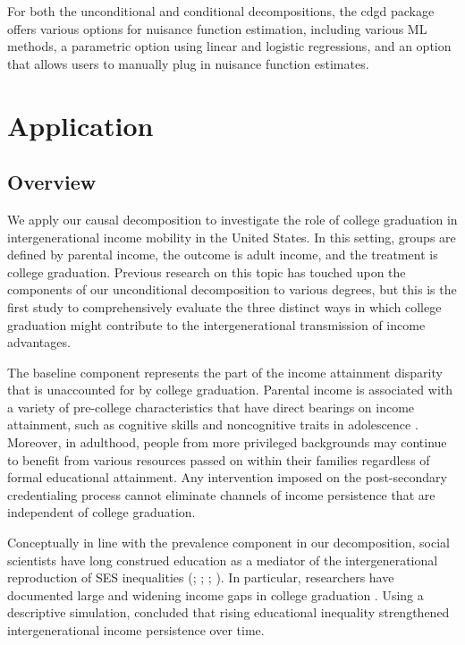 \documentclass[12pt,a4paper]{article}
\begin{document}
For both the unconditional and conditional decompositions, the cdgd package offers various options for nuisance function estimation, including various ML methods, a parametric option using linear and logistic regressions, and an option that allows users to manually plug in nuisance function estimates.


\section{Application}
\subsection{Overview}
We apply our causal decomposition to investigate the role of college graduation in intergenerational income mobility in the United States. In this setting, groups are defined by parental income, the outcome is adult income, and the treatment is college graduation. 
Previous research on this topic has touched upon the components of our unconditional decomposition to various degrees, but this is the first study to comprehensively evaluate the three distinct ways in which college graduation might contribute to the intergenerational transmission of income advantages. 

The baseline component represents the part of the income attainment disparity that is unaccounted for by college graduation. Parental income is associated with a variety of pre-college characteristics that have direct bearings on income attainment, such as cognitive skills and noncognitive traits in adolescence \citep{reardon_widening_2011, heckman_effects_2006, farkas_cognitive_2003}. Moreover, in adulthood, people from more privileged backgrounds may continue to benefit from various resources passed on within their families regardless of formal educational attainment. Any intervention imposed on the post-secondary credentialing process cannot eliminate channels of income persistence that are independent of college graduation. 

Conceptually in line with the prevalence component in our decomposition, social scientists have long construed education as a mediator of the intergenerational reproduction of SES inequalities (\citealp[chapter 4 \& 5]{blau_american_1978}; \citealp[p.255-9]{featherman_opportunity_1978}; \citealp{ishida_class_1995}; \citealp{breen_educational_2010}). In particular, researchers have documented large and widening income gaps in college graduation \citep{ziol-guest_parent_2016, bailey_gains_2011}. Using a descriptive simulation, \citet{bloome_educational_2018} concluded that rising educational inequality strengthened intergenerational income persistence over time. 
\end{document}

